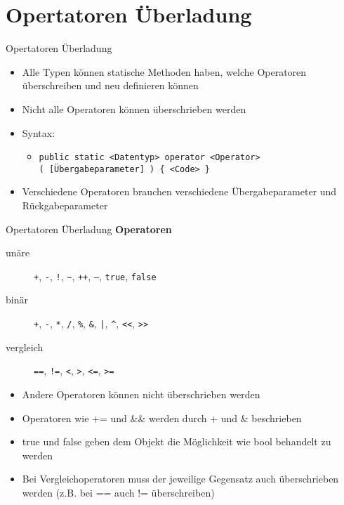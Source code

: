 \section{Opertatoren Überladung}
\begin{frame}{Opertatoren Überladung}
	\begin{itemize}
		\item Alle Typen können statische Methoden haben, welche Operatoren überschreiben und neu definieren können
		\item Nicht alle Operatoren können überschrieben werden
		\item Syntax:
		\begin{itemize}
			\item \texttt{public static \alert{<Datentyp>} operator \alert{<Operator>}\\( \alert{[Übergabeparameter]} ) \{ \alert{<Code>} \}}
		\end{itemize}
		\item Verschiedene Operatoren brauchen verschiedene Übergabeparameter und Rückgabeparameter
	\end{itemize}
\end{frame}

\begin{frame}{Opertatoren Überladung}
	\textbf{Operatoren}\\
	\begin{description}
		\item[unäre] \alert{\texttt{+}}, \alert{\texttt{-}}, \alert{\texttt{!}}, \alert{\texttt{\~}}, \alert{\texttt{++}}, \alert{\texttt{--}}, \alert{\texttt{true}}, \alert{\texttt{false}}
		\item[binär] \alert{\texttt{+}}, \alert{\texttt{-}}, \alert{\texttt{*}}, \alert{\texttt{/}}, \alert{\texttt{\%}}, \alert{\texttt{\&}}, \alert{\texttt{|}}, \alert{\texttt{\^}}, \alert{\texttt{<<}}, \alert{\texttt{>>}}
		\item[vergleich]  \alert{\texttt{==}}, \alert{\texttt{!=}}, \alert{\texttt{<}}, \alert{\texttt{>}}, \alert{\texttt{<=}}, \alert{\texttt{>=}}
	\end{description}
	\begin{itemize}
		\item Andere Operatoren können nicht überschrieben werden
		\item Operatoren wie \alert{+=} und \alert{\&\&} werden durch \alert{+} und \alert{\&} beschrieben
		\item \alert{true} und \alert{false} geben dem Objekt die Möglichkeit wie bool behandelt zu werden
		\item Bei Vergleichoperatoren muss der jeweilige Gegensatz auch überschrieben werden (z.B. bei \alert{==} auch \alert{!=} überschreiben)
	\end{itemize}
\end{frame}

